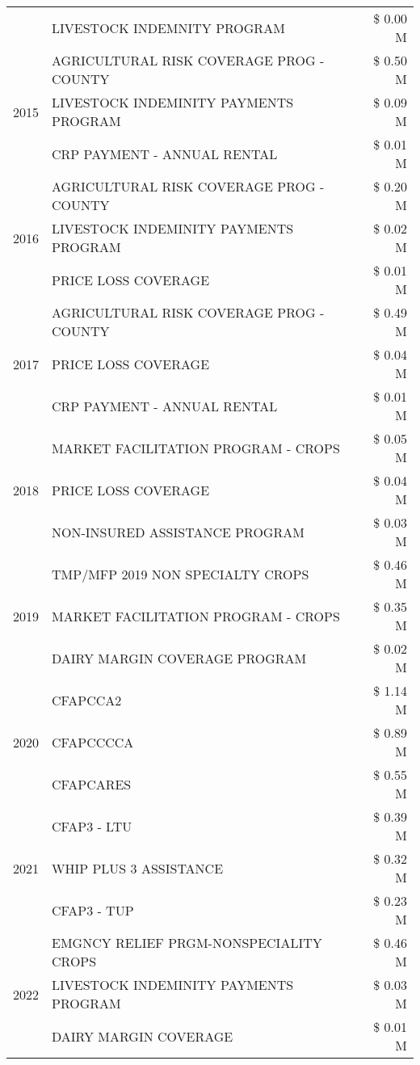 \begin{tabular}{llr}
 & LIVESTOCK INDEMNITY PROGRAM & \$ 0.00 M \\
\cline{1-3}
\multirow[t]{3}{*}{2015} & AGRICULTURAL RISK COVERAGE PROG - COUNTY & \$ 0.50 M \\
 & LIVESTOCK INDEMINITY PAYMENTS PROGRAM & \$ 0.09 M \\
 & CRP PAYMENT - ANNUAL RENTAL & \$ 0.01 M \\
\cline{1-3}
\multirow[t]{3}{*}{2016} & AGRICULTURAL RISK COVERAGE PROG - COUNTY & \$ 0.20 M \\
 & LIVESTOCK INDEMINITY PAYMENTS PROGRAM & \$ 0.02 M \\
 & PRICE LOSS COVERAGE & \$ 0.01 M \\
\cline{1-3}
\multirow[t]{3}{*}{2017} & AGRICULTURAL RISK COVERAGE PROG - COUNTY & \$ 0.49 M \\
 & PRICE LOSS COVERAGE & \$ 0.04 M \\
 & CRP PAYMENT - ANNUAL RENTAL & \$ 0.01 M \\
\cline{1-3}
\multirow[t]{3}{*}{2018} & MARKET FACILITATION PROGRAM - CROPS & \$ 0.05 M \\
 & PRICE LOSS COVERAGE & \$ 0.04 M \\
 & NON-INSURED ASSISTANCE PROGRAM & \$ 0.03 M \\
\cline{1-3}
\multirow[t]{3}{*}{2019} & TMP/MFP 2019 NON SPECIALTY CROPS & \$ 0.46 M \\
 & MARKET FACILITATION PROGRAM - CROPS & \$ 0.35 M \\
 & DAIRY MARGIN COVERAGE PROGRAM & \$ 0.02 M \\
\cline{1-3}
\multirow[t]{3}{*}{2020} & CFAPCCA2 & \$ 1.14 M \\
 & CFAPCCCCA & \$ 0.89 M \\
 & CFAPCARES & \$ 0.55 M \\
\cline{1-3}
\multirow[t]{3}{*}{2021} & CFAP3 - LTU & \$ 0.39 M \\
 & WHIP PLUS 3 ASSISTANCE & \$ 0.32 M \\
 & CFAP3 - TUP & \$ 0.23 M \\
\cline{1-3}
\multirow[t]{3}{*}{2022} & EMGNCY RELIEF PRGM-NONSPECIALITY CROPS & \$ 0.46 M \\
 & LIVESTOCK INDEMINITY PAYMENTS PROGRAM & \$ 0.03 M \\
 & DAIRY MARGIN COVERAGE & \$ 0.01 M \\
\cline{1-3}
\bottomrule
\end{tabular}

